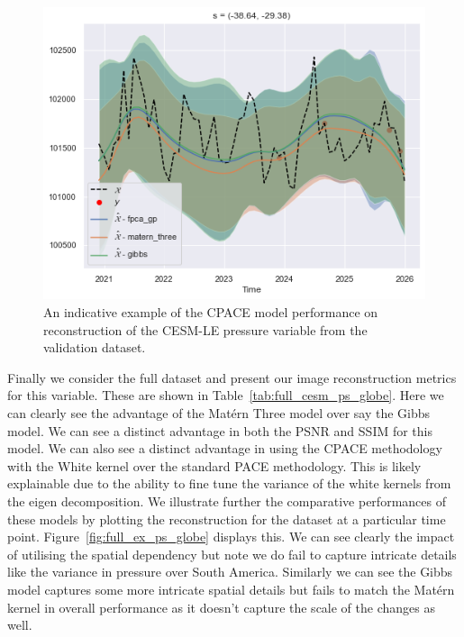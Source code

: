 \begin{figure}
	\centering
	\includegraphics[width=\textwidth]{train_ex_ps_globe}
	\caption{An indicative example of the CPACE model performance on reconstruction of the CESM-LE pressure variable from the validation dataset.}
	\label{fig:train_ex_ps_globe}
\end{figure}

Finally we consider the full dataset and present our image reconstruction metrics for this variable.
These are shown in Table~\ref{tab:full_cesm_ps_globe}.
Here we can clearly see the advantage of the Mat\'ern Three model over say the Gibbs model.
We can see a distinct advantage in both the PSNR and SSIM for this model.
We can also see a distinct advantage in using the CPACE methodology with the White kernel over the standard PACE methodology.
This is likely explainable due to the ability to fine tune the variance of the white kernels from the eigen decomposition. 
We illustrate further the comparative performances of these models by plotting the reconstruction for the dataset at a particular time point.
Figure~\ref{fig:full_ex_ps_globe} displays this.
We can see clearly the impact of utilising the spatial dependency but note we do fail to capture intricate details like the variance in pressure over South America.
Similarly we can see the Gibbs model captures some more intricate  spatial details but fails to match the Mat\'ern kernel in overall performance as it doesn't capture the scale of the changes as well. 

